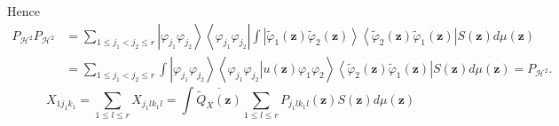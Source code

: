 \documentclass[aps,preprint]{revtex4}%
\begin{document}
Hence%
\begin{align}
P_{\mathcal{H}^{2}}P_{\mathcal{H}^{2}}  &  =\sum_{1\leq j_{1}<j_{2}\leq
r}\left\vert \varphi_{j_{1}}\varphi_{j_{2}}\right\rangle \left\langle
\varphi_{j_{1}}\varphi_{j_{2}}\right\vert \int\left\vert \tilde{\varphi}%
_{1}\left(  \mathbf{z}\right)  \tilde{\varphi}_{2}\left(  \mathbf{z}\right)
\right\rangle \left\langle \tilde{\varphi}_{2}\left(  \mathbf{z}\right)
\tilde{\varphi}_{1}\left(  \mathbf{z}\right)  \right\vert S\left(
\mathbf{z}\right)  d\mu\left(  \mathbf{z}\right) \\
&  =\sum_{1\leq j_{1}<j_{2}\leq r}\int\left\vert \varphi_{j_{1}}\varphi
_{j_{2}}\right\rangle \left\langle \varphi_{j_{1}}\varphi_{j_{2}}\left\vert
u\left(  \mathbf{z}\right)  \varphi_{1}\varphi_{2}\right.  \right\rangle
\left\langle \tilde{\varphi}_{2}\left(  \mathbf{z}\right)  \tilde{\varphi}%
_{1}\left(  \mathbf{z}\right)  \right\vert S\left(  \mathbf{z}\right)
d\mu\left(  \mathbf{z}\right)  =P_{\mathcal{H}^{2}}.
\end{align}%
\begin{equation}
X_{1j_{1}k_{1}}=\sum_{1\leq l\leq r}X_{j_{1}lk_{1}l}=\int\overline{\tilde
{Q}_{X}\left(  \mathbf{z}\right)  }\sum_{1\leq l\leq r}P_{j_{1}lk_{1}l}\left(
\mathbf{z}\right)  S\left(  \mathbf{z}\right)  d\mu\left(  \mathbf{z}\right)
\end{equation}%
\end{document}
